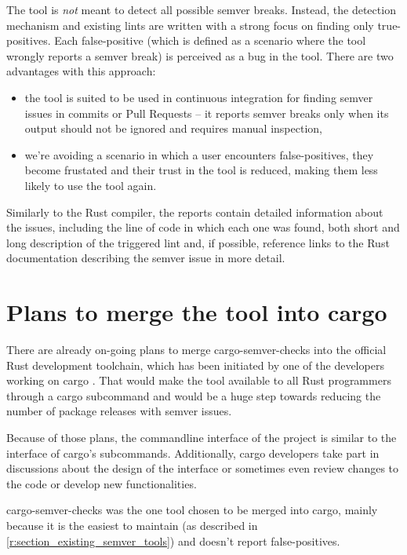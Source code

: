 \documentclass[licencjacka,en]{pracamgr}
\begin{document}
The tool is \textit{not} meant to detect all possible semver breaks.
Instead, the detection mechanism and existing lints are written
with a strong focus on finding only true-positives.
Each false-positive (which is defined as a scenario where the tool
wrongly reports a semver break) is perceived as a bug in the tool.
There are two advantages with this approach:
\begin{itemize}
	\item the tool is suited to be used in continuous integration
		for finding semver issues in commits or Pull Requests
		-- it reports semver breaks only when
		its output should not be ignored and requires manual inspection,
	\item we're avoiding a scenario in which
		a user encounters false-positives, they become frustated
		and their trust in the tool is reduced, making them
		less likely to use the tool again.
\end{itemize}

Similarly to the Rust compiler, the reports contain
detailed information about the issues, including
the line of code in which each one was found, both short and long description
of the triggered lint and, if possible, reference links to the Rust documentation
describing the semver issue in more detail.

\section{Plans to merge the tool into cargo}

There are already on-going plans to merge cargo-semver-checks into
the official Rust development toolchain,
which has been initiated by one of the developers working on cargo \cite{issue_merge_cargo}.
That would make the tool available to all Rust programmers
through a cargo subcommand and would be a huge step towards reducing the number of
package releases with semver issues.

Because of those plans, the commandline interface of the project is similar
to the interface of cargo's subcommands. Additionally, cargo developers
take part in discussions about the design of the interface \cite{issue_cli_interface}
or sometimes even review changes to the code or develop new functionalities.

cargo-semver-checks was the one tool chosen to be merged into cargo,
mainly because it is the easiest to maintain
(as described in \ref{r:section_existing_semver_tools})
and doesn't report false-positives.
\end{document}
